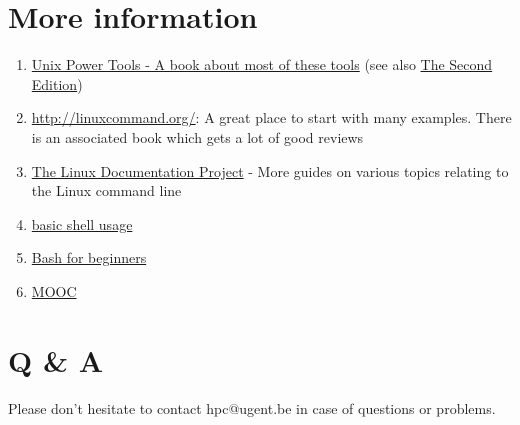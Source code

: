 \chapter{More information}

\begin{enumerate}
 \item \href{http://www.docstore.mik.ua/orelly/unix/upt/index.htm}{Unix Power
 Tools - A  book about most of these tools} (see also
 \href{http://www.docstore.mik.ua/orelly/unix2.1/index.htm}{The Second Edition})
 \item \url{http://linuxcommand.org/}: A great place to start with many examples. There is an associated book which gets a lot of good reviews
 \item \href{http://www.tldp.org/guides.html}{The Linux Documentation Project} - More guides on various topics relating to the Linux command line
 \item \href{http://linuxcommand.org/lc3_learning_the_shell.php}{basic shell usage}
 \item \href{http://www.tldp.org/LDP/Bash-Beginners-Guide/html/Bash-Beginners-Guide.html}{Bash for beginners}
 \item \href{https://www.edx.org/course/introduction-linux-linuxfoundationx-lfs101x-0}{MOOC}
\end{enumerate}

\chapter{Q & A}

Please don't hesitate to contact hpc@ugent.be in case of questions or problems.

